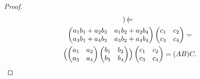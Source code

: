 \documentclass{article}
\begin{document}
\begin{proof}
\begin{multline*}
\begin{pmatrix}
        \end{pmatrix} = \\
        \begin{pmatrix}a_1 b_1 + a_2 b_3 & a_1 b_2 + a_2 b_4\\a_3 b_1 + a_4 b_3 & a_3 b_2 + a_4 b_4\end{pmatrix}\begin{pmatrix}c_1 & c_2 \\ c_3 & c_4\end{pmatrix} = \\
        \Bigl(\begin{pmatrix}a_1 & a_2\\a_3 & a_4\end{pmatrix}\begin{pmatrix}b_1 & b_2\\b_3 & b_4\end{pmatrix}\Bigr)\begin{pmatrix}c_1 & c_2\\c_3 & c_4\end{pmatrix} = (AB)C.
    \end{multline*}
\end{proof}
\end{document}
